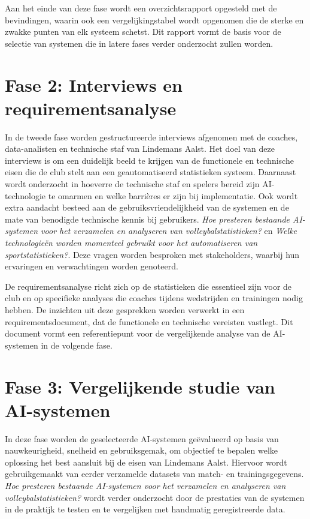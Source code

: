 Aan het einde van deze fase wordt een overzichtsrapport opgesteld met de bevindingen, waarin ook een vergelijkingstabel wordt opgenomen die de sterke en zwakke punten van elk systeem schetst. Dit rapport vormt de basis voor de selectie van systemen die in latere fases verder onderzocht zullen worden.

\section{Fase 2: Interviews en requirementsanalyse}
In de tweede fase worden gestructureerde interviews afgenomen met de coaches, data-analisten en technische staf van Lindemans Aalst. Het doel van deze interviews is om een duidelijk beeld te krijgen van de functionele en technische eisen die de club stelt aan een geautomatiseerd statistieken systeem. Daarnaast wordt onderzocht in hoeverre de technische staf en spelers bereid zijn AI-technologie te omarmen en welke barrières er zijn bij implementatie. Ook wordt extra aandacht besteed aan de gebruiksvriendelijkheid van de systemen en de mate van benodigde technische kennis bij gebruikers. \textit{Hoe presteren bestaande AI-systemen voor het verzamelen en analyseren van volleybalstatistieken?} en \textit{Welke technologieën worden momenteel gebruikt voor het automatiseren van sportstatistieken?}. Deze vragen worden besproken met stakeholders, waarbij hun ervaringen en verwachtingen worden genoteerd.

De requirementsanalyse richt zich op de statistieken die essentieel zijn voor de club en op specifieke analyses die coaches tijdens wedstrijden en trainingen nodig hebben. De inzichten uit deze gesprekken worden verwerkt in een requirementsdocument, dat de functionele en technische vereisten vastlegt. Dit document vormt een referentiepunt voor de vergelijkende analyse van de AI-systemen in de volgende fase.

\section{Fase 3: Vergelijkende studie van AI-systemen}
In deze fase worden de geselecteerde AI-systemen geëvalueerd op basis van nauwkeurigheid, snelheid en gebruiksgemak, om objectief te bepalen welke oplossing het best aansluit bij de eisen van Lindemans Aalst. Hiervoor wordt gebruikgemaakt van eerder verzamelde datasets van match- en trainingsgegevens. \textit{Hoe presteren bestaande AI-systemen voor het verzamelen en analyseren van volleybalstatistieken?} wordt verder onderzocht door de prestaties van de systemen in de praktijk te testen en te vergelijken met handmatig geregistreerde data.

